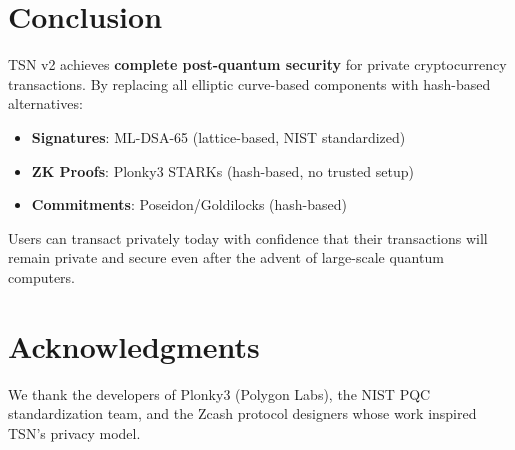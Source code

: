 \documentclass[11pt,a4paper]{article}
\begin{document}
\section{Conclusion}

TSN v2 achieves \textbf{complete post-quantum security} for private cryptocurrency transactions. By replacing all elliptic curve-based components with hash-based alternatives:

\begin{itemize}
    \item \textbf{Signatures}: ML-DSA-65 (lattice-based, NIST standardized)
    \item \textbf{ZK Proofs}: Plonky3 STARKs (hash-based, no trusted setup)
    \item \textbf{Commitments}: Poseidon/Goldilocks (hash-based)
\end{itemize}

Users can transact privately today with confidence that their transactions will remain private and secure even after the advent of large-scale quantum computers.

\section*{Acknowledgments}

We thank the developers of Plonky3 (Polygon Labs), the NIST PQC standardization team, and the Zcash protocol designers whose work inspired TSN's privacy model.
\end{document}
